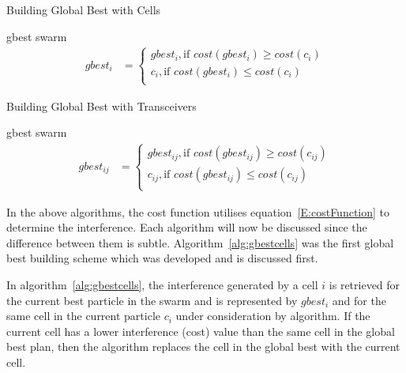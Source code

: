 \begin{algorithm}[H]
\caption{Building Global Best with Cells}
\label{alg:gbestcells}
\begin{algorithmic}[1]
\Require gbest
\Require swarm
\begin{align}
gbest_{i}&=
    \begin{cases}
        gbest_{i} , \text{if $cost(gbest_{i}) \ge cost(c_{i})$}\\
        c_{i}, \text{if $cost(gbest_{i}) \leq cost(c_{i})$}\\
    \end{cases}
\end{align}
\EndFor
\end{algorithmic}
\end{algorithm}

\begin{algorithm}[H]
\caption{Building Global Best with Transceivers}
\label{alg:gbesttrx}
\begin{algorithmic}[1]
\Require gbest
\Require swarm
	\begin{align}
gbest_{ij}&=
    \begin{cases}
        gbest_{ij} , \text{if $cost(gbest_{ij}) \ge cost(c_{ij})$}\\
        c_{ij}, \text{if $cost(gbest_{ij}) \leq cost(c_{ij})$}\\
    \end{cases}
\end{align}
\EndFor
\end{algorithmic}
\end{algorithm}

In the above algorithms, the cost function utilises equation~\ref{E:costFunction} to determine the interference. Each algorithm will now be discussed since the difference between them is subtle. Algorithm~\ref{alg:gbestcells} was the first global best building scheme which was developed and is discussed first.

In algorithm~\ref{alg:gbestcells}, the interference generated by a cell $i$ is retrieved for the current best particle in the swarm and is represented by $gbest_i$ and for the same cell in the current particle $c_i$ under consideration by algorithm. If the current cell has a lower interference (cost) value than the same cell in the global best plan, then the algorithm replaces the cell in the global best with the current cell.

